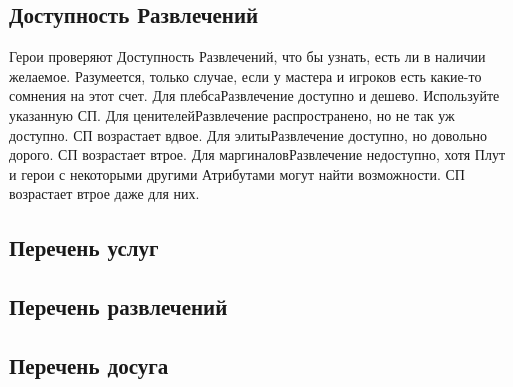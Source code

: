 \subsection{Доступность Развлечений}
Герои проверяют Доступность Развлечений, что бы узнать, есть ли в наличии желаемое. Разумеется, только случае, если у мастера и игроков есть какие-то сомнения на этот счет.
\trouble
{Для плебса}{Развлечение доступно и дешево. Используйте указанную СП.}
{Для ценителей}{Развлечение распространено, но не так уж доступно. СП возрастает вдвое.}
{Для элиты}{Развлечение доступно, но довольно дорого. СП возрастает втрое.}
{Для маргиналов}{Развлечение недоступно, хотя Плут и герои с некоторыми другими Атрибутами могут найти возможности. СП возрастает втрое даже для них.}

\subsection{Перечень услуг}

\subsection{Перечень развлечений}

\subsection{Перечень досуга}
